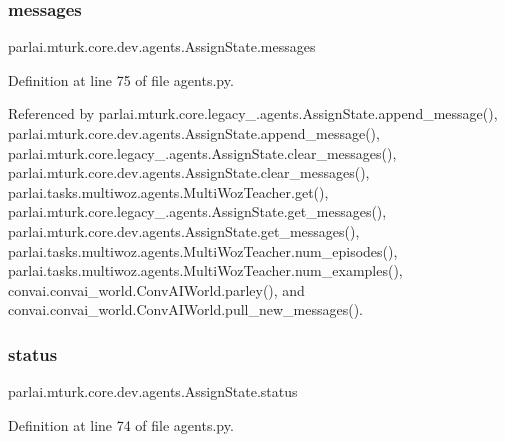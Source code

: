 \subsubsection{\texorpdfstring{messages}{messages}}
{\footnotesize\ttfamily parlai.\+mturk.\+core.\+dev.\+agents.\+Assign\+State.\+messages}



Definition at line 75 of file agents.\+py.



Referenced by parlai.\+mturk.\+core.\+legacy\+\_.\+agents.\+Assign\+State.\+append\+\_\+message(), parlai.\+mturk.\+core.\+dev.\+agents.\+Assign\+State.\+append\+\_\+message(), parlai.\+mturk.\+core.\+legacy\+\_.\+agents.\+Assign\+State.\+clear\+\_\+messages(), parlai.\+mturk.\+core.\+dev.\+agents.\+Assign\+State.\+clear\+\_\+messages(), parlai.\+tasks.\+multiwoz.\+agents.\+Multi\+Woz\+Teacher.\+get(), parlai.\+mturk.\+core.\+legacy\+\_.\+agents.\+Assign\+State.\+get\+\_\+messages(), parlai.\+mturk.\+core.\+dev.\+agents.\+Assign\+State.\+get\+\_\+messages(), parlai.\+tasks.\+multiwoz.\+agents.\+Multi\+Woz\+Teacher.\+num\+\_\+episodes(), parlai.\+tasks.\+multiwoz.\+agents.\+Multi\+Woz\+Teacher.\+num\+\_\+examples(), convai.\+convai\+\_\+world.\+Conv\+A\+I\+World.\+parley(), and convai.\+convai\+\_\+world.\+Conv\+A\+I\+World.\+pull\+\_\+new\+\_\+messages().

\mbox{\label{classparlai_1_1mturk_1_1core_1_1dev_1_1agents_1_1AssignState_a28eccfd2b979c7c1cf45a441ce614a16}} 
\subsubsection{\texorpdfstring{status}{status}}
{\footnotesize\ttfamily parlai.\+mturk.\+core.\+dev.\+agents.\+Assign\+State.\+status}



Definition at line 74 of file agents.\+py.




